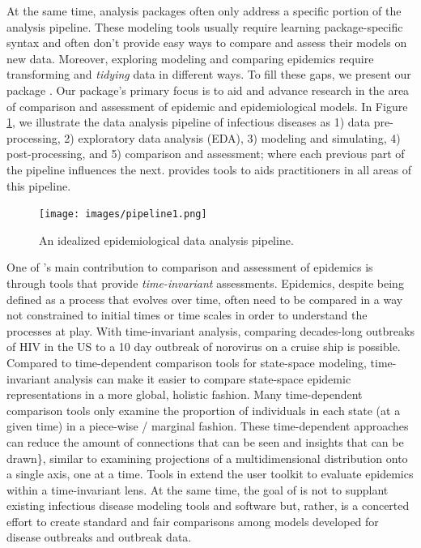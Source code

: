 \documentclass[
  shortnames]{jss}
\begin{document}
At the same time, analysis packages often only address a specific
portion of the analysis pipeline. These modeling tools usually require
learning package-specific syntax and often don't provide easy ways to
compare and assess their models on new data. Moreover, exploring
modeling and comparing epidemics require transforming and
\textit{tidying} data in different ways. To fill these gaps, we present
our  package . Our package's primary focus
is to aid and advance research in the area of comparison and assessment
of epidemic and epidemiological models. In Figure \ref{fig:pipeline}, we
illustrate the data analysis pipeline of infectious diseases as 1) data
pre-processing, 2) exploratory data analysis (EDA), 3) modeling and
simulating, 4) post-processing, and 5) comparison and assessment; where
each previous part of the pipeline influences the next. 
provides tools to aids practitioners in all areas of this pipeline.

\begin{figure}[!ht]
    \centering
    \texttt{[image: images/pipeline1.png]}
    \caption{An idealized epidemiological data analysis pipeline.}
    \label{fig:pipeline}
\end{figure}

One of 's main contribution to comparison and assessment
of epidemics is through tools that provide \textit{time-invariant}
assessments. Epidemics, despite being defined as a process that evolves
over time, often need to be compared in a way not constrained to initial
times or time scales in order to understand the processes at play. With
time-invariant analysis, comparing decades-long outbreaks of HIV in the
US to a 10 day outbreak of norovirus on a cruise ship is possible.
Compared to time-dependent comparison tools for state-space modeling,
time-invariant analysis can make it easier to compare state-space
epidemic representations in a more global, holistic fashion. Many
time-dependent comparison tools only examine the proportion of
individuals in each state (at a given time) in a piece-wise / marginal
fashion. These time-dependent approaches can reduce the amount of
connections that can be seen and insights that can be drawn\}, similar
to examining projections of a multidimensional distribution onto a
single axis, one at a time. Tools in  extend the user
toolkit to evaluate epidemics within a time-invariant lens. At the same
time, the goal of  is not to supplant existing
infectious disease modeling tools and software but, rather, is a
concerted effort to create standard and fair comparisons among models
developed for disease outbreaks and outbreak data.
\end{document}

